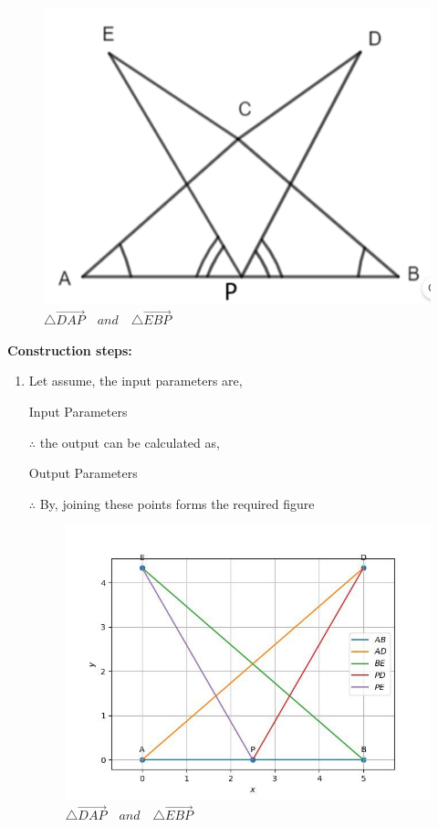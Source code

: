 \begin{enumerate}[label=\thesection.\arabic*,ref=\thesection.\theenumi]
\begin{figure}[!ht]
    \includegraphics[width=\columnwidth]{figs/mc.png}
	\caption{$\triangle  \vec{DAP} \hspace{12pt} and \hspace{12pt} \triangle \vec{EBP}$}
 \label{fig:fig1}
\end{figure}
\textbf{Construction steps:}
		\begin{enumerate}[label=(\roman*)]
\item Let assume, the input parameters are, 
\begin{table}[!ht]
\centering
	
	  \caption{Input Parameters}
	  \label{Table-1: }
\end{table}
$\therefore$ the output can be calculated as,
\begin{table}[!ht]
\centering
	
	  \caption{Output Parameters}
	  \label{Table-2: }
\end{table}
$\therefore$ By, joining these points forms the required figure
\begin{figure}[!ht]
	\centering
    \includegraphics[width=0.8\columnwidth]{figs/fig_math_comp}
	\caption{$\triangle \vec{DAP} \hspace{12pt} and \hspace{12pt} \triangle \vec{EBP}$}
    \label{fig:fig2}
\end{figure}
\end{enumerate}
\end{enumerate}
